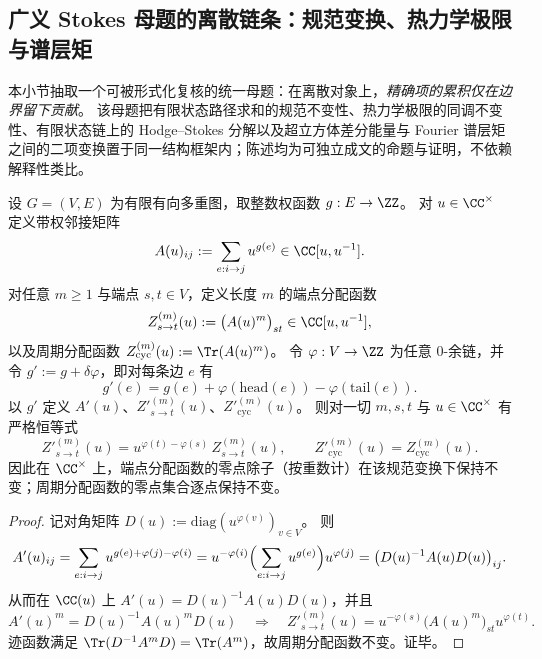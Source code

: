 \subsection{广义 Stokes 母题的离散链条：规范变换、热力学极限与谱层矩}\label{subsec:discussion-generalized-stokes-path-sum}
本小节抽取一个可被形式化复核的统一母题：在离散对象上，\emph{精确项的累积仅在边界留下贡献}。
该母题把有限状态路径求和的规范不变性、热力学极限的同调不变性、有限状态链上的 Hodge--Stokes 分解以及超立方体差分能量与 Fourier 谱层矩之间的二项变换置于同一结构框架内；陈述均为可独立成文的命题与证明，不依赖解释性类比。

\begin{theorem}\label{thm:discussion-discrete-stokes-gauge-leyang}
设 \(G=(V,E)\) 为有限有向多重图，取整数权函数 \(g:E\to\ZZ\)。
对 \(u\in\CC^\times\) 定义带权邻接矩阵
\[
  A(u)_{ij}:=\sum_{e:i\to j}u^{g(e)}\in\CC[u,u^{-1}].
\]
对任意 \(m\ge 1\) 与端点 \(s,t\in V\)，定义长度 \(m\) 的端点分配函数
\[
  Z^{(m)}_{s\to t}(u):=\bigl(A(u)^m\bigr)_{st}\in\CC[u,u^{-1}],
\]
以及周期分配函数 \(Z^{(m)}_{\mathrm{cyc}}(u):=\Tr(A(u)^m)\)。
令 \(\varphi:V\to\ZZ\) 为任意 \(0\)-余链，并令 \(g':=g+\delta\varphi\)，即对每条边 \(e\) 有
\[
  g'(e)=g(e)+\varphi(\mathrm{head}(e))-\varphi(\mathrm{tail}(e)).
\]
以 \(g'\) 定义 \(A'(u)\)、\(Z'^{(m)}_{s\to t}(u)\)、\(Z'^{(m)}_{\mathrm{cyc}}(u)\)。
则对一切 \(m,s,t\) 与 \(u\in\CC^\times\) 有严格恒等式
\[
  Z'^{(m)}_{s\to t}(u)=u^{\varphi(t)-\varphi(s)}\,Z^{(m)}_{s\to t}(u),
  \qquad
  Z'^{(m)}_{\mathrm{cyc}}(u)=Z^{(m)}_{\mathrm{cyc}}(u).
\]
因此在 \(\CC^\times\) 上，端点分配函数的零点除子（按重数计）在该规范变换下保持不变；周期分配函数的零点集合逐点保持不变。
\end{theorem}

\begin{proof}
记对角矩阵 \(D(u):=\mathrm{diag}(u^{\varphi(v)})_{v\in V}\)。
则
\[
  A'(u)_{ij}
  =\sum_{e:i\to j}u^{g(e)+\varphi(j)-\varphi(i)}
  =u^{-\varphi(i)}\Bigl(\sum_{e:i\to j}u^{g(e)}\Bigr)u^{\varphi(j)}
  =\bigl(D(u)^{-1}A(u)D(u)\bigr)_{ij}.
\]
从而在 \(\CC(u)\) 上 \(A'(u)=D(u)^{-1}A(u)D(u)\)，并且
\[
  A'(u)^m=D(u)^{-1}A(u)^mD(u)
  \quad\Rightarrow\quad
  Z'^{(m)}_{s\to t}(u)=u^{-\varphi(s)}\bigl(A(u)^m\bigr)_{st}u^{\varphi(t)}.
\]
迹函数满足 \(\Tr(D^{-1}A^mD)=\Tr(A^m)\)，故周期分配函数不变。证毕。
\end{proof}

